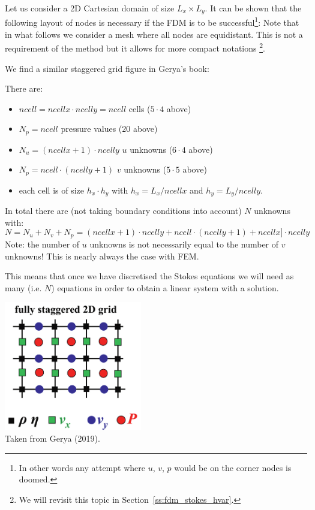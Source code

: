 Let us consider a 2D Cartesian domain of size $L_x \times L_y$.
It can be shown that the following layout of nodes is necessary 
if the FDM is to be successful\footnote{In other words
any attempt where $u$, $v$, $p$ would be on the corner nodes is doomed.}:
Note that in what follows we consider a mesh where all nodes are equidistant.
This is not a requirement of the method but it allows for more compact notations
\footnote{We will revisit this topic in Section~\ref{ss:fdm_stokes_hvar}.}. 

We find a similar staggered grid figure in Gerya's book:



There are:
\begin{itemize}
\item ${ncell}={ ncellx}\cdot { ncelly}={ ncell}$ cells ($5\cdot 4$ above)
\item ${N_p}={ ncell}$ pressure values ($20$ above)
\item ${N_u}={ (ncellx+1)}\cdot { ncelly}$ $u$ unknowns ($6\cdot 4$ above) 
\item ${N_p}={ ncell}\cdot { (ncelly+1)}$ $v$ unknowns ($5\cdot 5$ above) 
\item each cell is of size $h_x \cdot h_y$ 
with $h_x=L_x/{ ncellx}$ and $h_y=L_y/{ ncelly}$.
\end{itemize}
In total there are (not taking boundary conditions into account)
$N$ unknowns with:
\[
N=N_u+N_v+N_p
= { (ncellx+1)}\cdot{ ncelly}
+ { ncell}\cdot{ (ncelly+1)}
+ { ncellx}]\cdot{ ncelly} 
\]
Note: the number of $u$ unknowns is not necessarily equal to the number of $v$
unknowns! This is nearly always the case with FEM. 

This means that once we have discretised the Stokes equations we will need
as many (i.e. $N$) equations in order to obtain a linear system with a solution.


\begin{center}
\includegraphics[width=6cm]{images/fdm/gerya_A}\\
{\captionfont Taken from Gerya (2019).}
\end{center}


